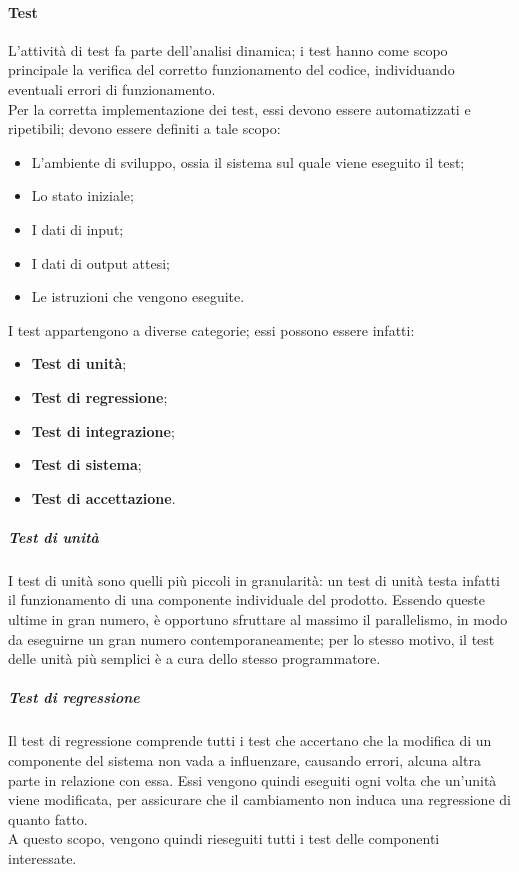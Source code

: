 \documentclass[../norme-di-progetto.tex]{subfiles}
\begin{document}
\paragraph{Test}
L'attività di test fa parte dell'analisi dinamica; i test hanno come scopo principale la verifica del corretto funzionamento del codice, individuando eventuali errori di funzionamento. \\
Per la corretta implementazione dei test, essi devono essere automatizzati e ripetibili; devono essere definiti a tale scopo:
\begin{itemize}
  \item L'ambiente di sviluppo, ossia il sistema sul quale viene eseguito il test;
  \item Lo stato iniziale;
  \item I dati di input;
  \item I dati di output attesi;
  \item Le istruzioni che vengono eseguite.
\end{itemize}
I test appartengono a diverse categorie; essi possono essere infatti:
\begin{itemize}
  \item \textbf{Test di unità};
  \item \textbf{Test di regressione};
  \item \textbf{Test di integrazione};
  \item \textbf{Test di sistema};
  \item \textbf{Test di accettazione}.
\end{itemize}

\subparagraph*{Test di unità}
I test di unità sono quelli più piccoli in granularità: un test di unità testa infatti il funzionamento di una componente individuale del prodotto. Essendo queste ultime in gran numero, è opportuno sfruttare al massimo il parallelismo, in modo da eseguirne un gran numero contemporaneamente; per lo stesso motivo, il test delle unità più semplici è a cura dello stesso programmatore.

\subparagraph*{Test di regressione}
Il test di regressione comprende tutti i test che accertano che la modifica di un componente del sistema non vada a influenzare, causando errori, alcuna altra parte in relazione con essa. Essi vengono quindi eseguiti ogni volta che un'unità viene modificata, per assicurare che il cambiamento non induca una regressione di quanto fatto. \\
A questo scopo, vengono quindi rieseguiti tutti i test delle componenti interessate.
\end{document}
